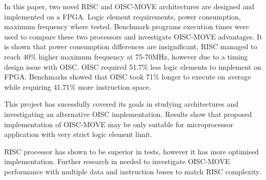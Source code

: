 \iffalse
The final chapter is short and sweet, to the point:
 what did you really accomplish? 
 What significant result can you claim and how it differs from anything done before. 
 How well did you meet your goal? 
 Now step out one level, then another indicating the impact your work will have on the literature and on future endeavours.
 * Start with the specifics and end with the general.
 * Summarise key result; mention limitations, note anything unexpected.
\fi

In this paper, two novel RISC and OISC-MOVE architectures are designed and implemented on a FPGA. Logic element requirements, power consumption, maximum frequency where tested. Benchmark programs execution times were used to compare these two processors and investigate OISC-MOVE advantages. It is shown that power consumption differences are insignificant, RISC managed to reach 40\% higher maximum frequency at 75-70MHz, however due to a timing design issue with OISC. OISC required 51.7\% less logic elements to implement on FPGA. Benchmarks showed that OISC took 71\% longer to execute on average while requiring 41.71\% more instruction space. 

This project has sucessfully covered its goals in studying architectures and investigating an alternative OISC implementation. Results show that proposed implementation of OISC-MOVE may be only suitable for microprocessor application with very strict logic element limit. 

RISC processor has shown to be superior in tests, however it has more optimised implementation. Further research in needed to investigate OISC-MOVE performance with multiple data and instruction buses to match RISC complexity. 
